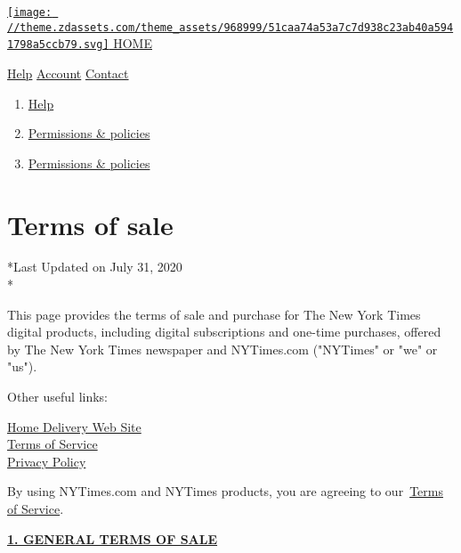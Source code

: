 \href{https://nytimes3xbfgragh.onion}{\texttt{[image: //theme.zdassets.com/theme\_assets/968999/51caa74a53a7c7d938c23ab40a5941798a5ccb79.svg]}
HOME}

\href{/hc/en-us}{Help} \textbar{}
\href{https://myaccount.nytimes3xbfgragh.onion/seg/}{Account} \textbar{}
\href{https://help.nytimes3xbfgragh.onion/hc/en-us/articles/115015385887-Contact-Us}{Contact}

\begin{enumerate}
\def\labelenumi{\arabic{enumi}.}
\tightlist
\item
  \href{/hc/en-us}{Help}
\item
  \href{/hc/en-us/categories/115001547468-Permissions-policies}{Permissions
  \& policies}
\item
  \href{/hc/en-us/sections/115002797688-Permissions-policies}{Permissions
  \& policies}
\end{enumerate}

\hypertarget{terms-of-sale}{%
\section{Terms of sale}\label{terms-of-sale}}

*Last Updated on July 31, 2020\\
*

This page provides the terms of sale and purchase for The New York Times
digital products, including digital subscriptions and one-time
purchases, offered by The New York Times newspaper and NYTimes.com
("NYTimes" or "we" or "us").

Other useful links:

\href{http://homedelivery.nytimes3xbfgragh.onion/HDS/HDSHome.do?mode=HDSHome}{Home
Delivery Web Site\\
}\href{https://help.nytimes3xbfgragh.onion/hc/en-us/articles/115014893428-Terms-of-service}{Terms
of Service\\
}\href{https://help.nytimes3xbfgragh.onion/hc/en-us/articles/115014892108-Privacy-policy}{Privacy
Policy}

By using NYTimes.com and NYTimes products, you are agreeing to
our~\href{https://help.nytimes3xbfgragh.onion/hc/en-us/articles/115014893428-Terms-of-service}{Terms
of Service}.

\protect\hyperlink{general}{\textbf{1. GENERAL TERMS OF SALE}}

